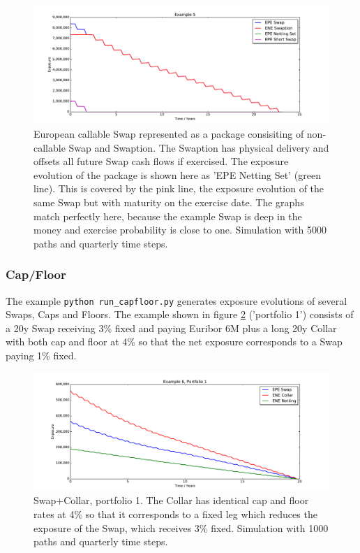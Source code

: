 \begin{figure}[hbt]
\begin{center}
\includegraphics[scale=0.45]{examples/mpl_callable_swap.pdf}
\end{center}
\caption{European callable Swap represented as a package consisiting of non-callable Swap and Swaption. The Swaption has
  physical delivery and offsets all future Swap cash flows if exercised. The exposure evolution of the package is shown
  here as 'EPE Netting Set' (green line). This is covered by the pink line, the exposure evolution of the same Swap but
  with maturity on the exercise date. The graphs match perfectly here, because the example Swap is deep in the money and
  exercise probability is close to one. Simulation with 5000 paths and quarterly time steps.}
\label{fig_4}
\end{figure}

\clearpage

\subsubsection{Cap/Floor}\label{example:exposure_capfloor}

The example {\tt python run\_capfloor.py} generates exposure evolutions of several Swaps, Caps and Floors. The
example shown in figure \ref{fig_capfloor_1} ('portfolio 1') consists of a 20y Swap receiving 3\% fixed and paying
Euribor 6M plus a long 20y Collar with both cap and floor at 4\% so that the net exposure corresponds to a Swap
paying 1\% fixed. \\

\begin{figure}[h!]
\begin{center}
\includegraphics[scale=0.45]{examples/mpl_capfloor_1.pdf}
\end{center}
\caption{Swap+Collar, portfolio 1. The Collar has identical cap and floor rates at 4\% so that it corresponds to a
  fixed leg which reduces the exposure of the Swap, which receives 3\% fixed. Simulation with 1000 paths and quarterly
  time steps.}
\label{fig_capfloor_1}
\end{figure}

